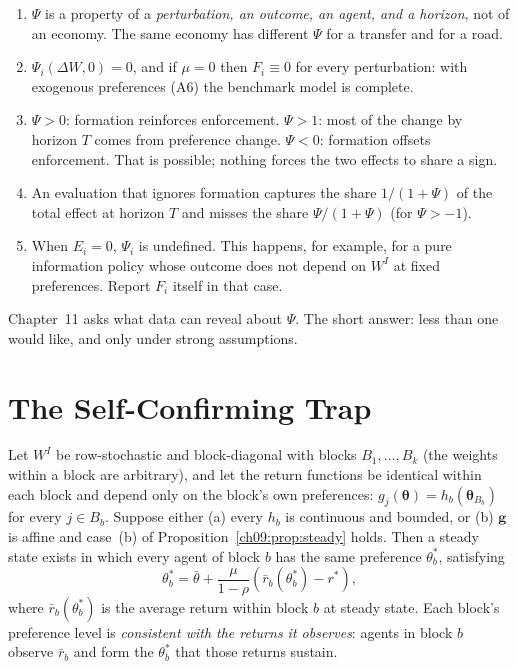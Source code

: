 \documentclass[../structural_economics_book.tex]{subfiles}
\begin{document}
\begin{remark}\label{ch09:rem:psi}
\begin{enumerate}
\item $\Psi$ is a property of a \textit{perturbation, an outcome, an agent, and a horizon}, not of an economy. The same economy has different $\Psi$ for a transfer and for a road.
\item $\Psi_i(\Delta W, 0) = 0$, and if $\mu = 0$ then $F_i \equiv 0$ for every perturbation: with exogenous preferences (A6) the benchmark model is complete.
\item $\Psi > 0$: formation reinforces enforcement. $\Psi > 1$: most of the change by horizon $T$ comes from preference change. $\Psi < 0$: formation offsets enforcement. That is possible; nothing forces the two effects to share a sign.
\item An evaluation that ignores formation captures the share $1/(1+\Psi)$ of the total effect at horizon $T$ and misses the share $\Psi/(1+\Psi)$ (for $\Psi > -1$).
\item When $E_i = 0$, $\Psi_i$ is undefined. This happens, for example, for a pure information policy whose outcome does not depend on $W^I$ at fixed preferences. Report $F_i$ itself in that case.
\end{enumerate}
\end{remark}

Chapter~11 asks what data can reveal about $\Psi$. The short answer: less than one would like, and only under strong assumptions.


\section{The Self-Confirming Trap}
\label{ch09:sec:trap}

\begin{proposition}\label{ch09:thm:self_confirming}
Let $W^I$ be row-stochastic and block-diagonal with blocks $B_1, \ldots, B_k$ (the weights within a block are arbitrary), and let the return functions be identical within each block and depend only on the block's own preferences: $g_j(\boldsymbol{\theta}) = h_b(\boldsymbol{\theta}_{B_b})$ for every $j \in B_b$. Suppose either (a) every $h_b$ is continuous and bounded, or (b) $\mathbf{g}$ is affine and case~(b) of Proposition~\ref{ch09:prop:steady} holds. Then a steady state exists in which every agent of block $b$ has the same preference $\theta^*_b$, satisfying
\begin{equation}\label{ch09:eq:self_confirming}
\theta^*_b = \bar{\theta} + \frac{\mu}{1-\rho}\left(\bar{r}_b(\theta^*_b) - r^*\right),
\end{equation}
where $\bar{r}_b(\theta^*_b)$ is the average return within block $b$ at steady state. Each block's preference level is \textit{consistent with the returns it observes}: agents in block $b$ observe $\bar{r}_b$ and form the $\theta^*_b$ that those returns sustain.
\end{proposition}
\end{document}
